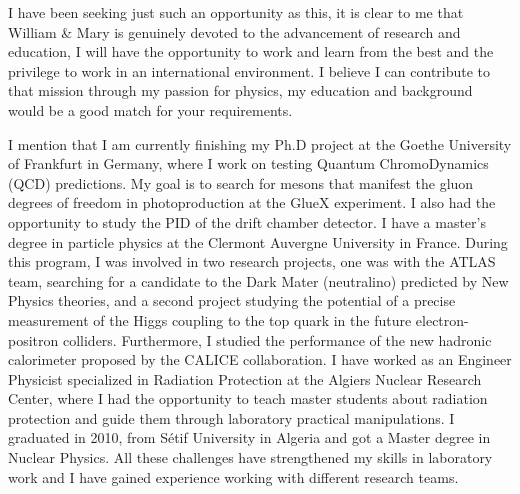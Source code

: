 \documentclass[11pt]{letter}
\begin{document}
I have been seeking just such an opportunity as this, it is clear to me that William \& Mary is genuinely devoted to the advancement of research and education, I will have the opportunity to work and learn from the best and the privilege to work in an international environment. I believe I can contribute to that mission through my passion for physics, my education and background would be a good match for your requirements.
~\par I mention that I am currently finishing my Ph.D project at the Goethe University of Frankfurt in Germany, where I work on testing Quantum ChromoDynamics (QCD) predictions. My goal is to search for mesons that manifest the gluon degrees of freedom in photoproduction at the GlueX experiment. I also had the opportunity to study the PID of the drift chamber detector. I have a master's degree in particle physics at the Clermont Auvergne University in France. During this program, I was involved in two research projects, one was with the ATLAS team, searching for a candidate to the Dark Mater (neutralino) predicted by New Physics theories, and a second project studying the potential of a precise measurement of the Higgs coupling to the top quark in the future electron-positron colliders. Furthermore, I studied the performance of the new hadronic calorimeter proposed by the CALICE collaboration. I have worked as an Engineer Physicist specialized in Radiation Protection at the Algiers Nuclear Research Center, where I had the opportunity to teach master students about radiation protection and guide them through laboratory practical manipulations. I graduated in 2010, from S\'etif University in Algeria and got a Master degree in Nuclear Physics.
All these challenges have strengthened my skills in laboratory work and I have gained experience working with different research teams.
\end{document}
